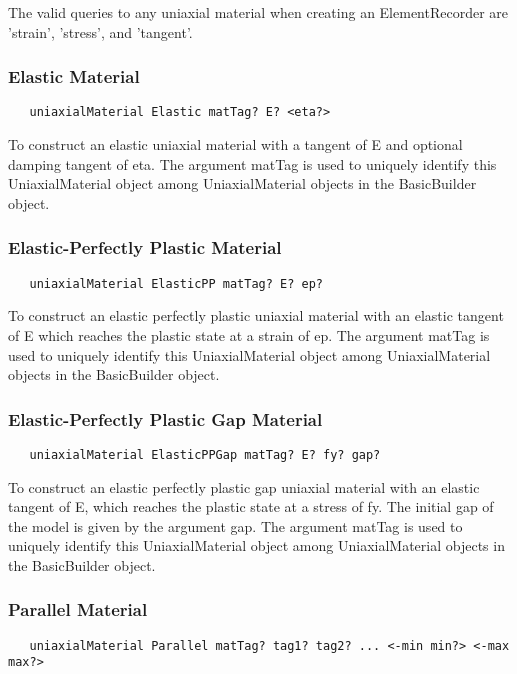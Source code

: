 \documentclass[12pt]{article}
\begin{document}
The valid queries to any uniaxial material when creating an ElementRecorder
are 'strain', 'stress', and 'tangent'.

\subsubsection{Elastic Material}
{\sf\small
\begin{verbatim}
   uniaxialMaterial Elastic matTag? E? <eta?>
\end{verbatim}
}

\noindent To construct an elastic uniaxial material with a tangent of E
and optional damping tangent of eta. The argument matTag is used to
uniquely identify this UniaxialMaterial object among UniaxialMaterial objects
in the BasicBuilder object.

\subsubsection{Elastic-Perfectly Plastic Material}
{\sf\small
\begin{verbatim}
   uniaxialMaterial ElasticPP matTag? E? ep?
\end{verbatim}
}

\noindent To construct an elastic perfectly plastic uniaxial material
with an elastic tangent of E which
reaches the plastic state at a strain of ep. The argument matTag is used to
uniquely identify this UniaxialMaterial object among UniaxialMaterial objects
in the BasicBuilder object.

\subsubsection{Elastic-Perfectly Plastic Gap Material}
{\sf\small
\begin{verbatim}
   uniaxialMaterial ElasticPPGap matTag? E? fy? gap?
\end{verbatim}
}

\noindent To construct an elastic perfectly plastic gap uniaxial material
with an elastic tangent of E, which reaches the plastic state at a stress 
of fy. The initial gap of the model is given by the argument gap. The argument
matTag is used to uniquely identify this UniaxialMaterial object among
UniaxialMaterial objects in the BasicBuilder object.

\subsubsection{Parallel Material}
{\sf\small
\begin{verbatim}
   uniaxialMaterial Parallel matTag? tag1? tag2? ... <-min min?> <-max max?>
\end{verbatim}
}
\end{document}
